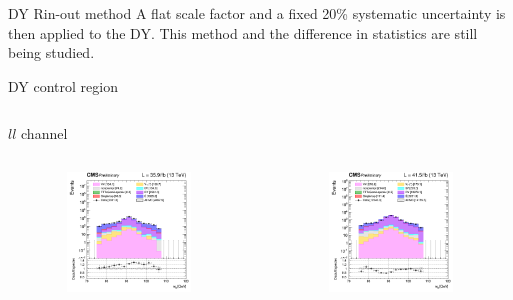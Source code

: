 \documentclass[8pt]{beamer}
\begin{document}
\begin{frame}{DY Rin-out method}
\vspace{-5pt}
A flat scale factor and a fixed 20\% systematic uncertainty is then applied to the DY. This method and the difference in statistics are still being studied. \vfill
\end{frame}

\begin{frame}{DY control region}
\justifying
\begin{columns}
\begin{column}{1.09\textwidth}
\begin{block}{\centering $ll$ channel}\end{block}
\end{column}
\end{columns} \vspace{-5pt}
\begin{columns}
		\begin{column}{0.33\textwidth}
			\begin{center}
			\vspace{-8pt}
			\begin{block}{}\end{block}\vspace{5pt}
     			\includegraphics[width=1.0\textwidth, height=90pt]{figs/2016/log_cratio_dyCR_ll_mllpeak.png}
    		\end{center}		
		\end{column} 
		\begin{column}{0.33\textwidth}
			\begin{center}
			\vspace{-8pt}
			\begin{block}{}\end{block}\vspace{5pt}
     			\includegraphics[width=1.0\textwidth, height=90pt]{figs/2017/log_cratio_dyCR_ll_mllpeak.png}

\end{center}
\end{column}
\end{columns}
\end{frame}
\end{document}
